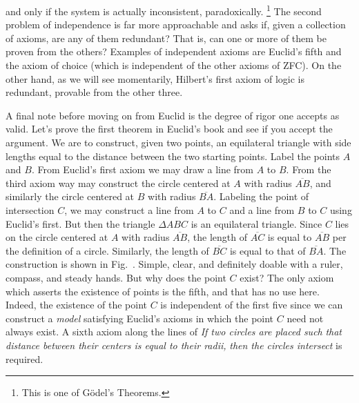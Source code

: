         and only if the system is actually inconsistent, paradoxically.%
        \footnote{%
            This is one of G\"{o}del's Theorems.
        }
        The second problem of independence is far more approachable and asks if,
        given a collection of axioms, are any of them redundant? That is, can
        one or more of them be proven from the others? Examples of independent
        axioms are Euclid's fifth and the axiom of choice (which is independent
        of the other axioms of ZFC). On the other hand, as we will see
        momentarily, Hilbert's first axiom of logic is redundant, provable from
        the other three.
        \par\hfill\par
        A final note before moving on from Euclid is the degree of rigor one
        accepts as valid. Let's prove the first theorem in Euclid's book and see
        if you accept the argument. We are to construct, given two points, an
        equilateral triangle with side lengths equal to the distance between the
        two starting points. Label the points $A$ and $B$. From Euclid's first
        axiom we may draw a line from $A$ to $B$. From the third axiom way may
        construct the circle centered at $A$ with radius $\overline{AB}$, and
        similarly the circle centered at $B$ with radius $\overline{BA}$.
        Labeling the point of intersection $C$, we may construct a line from $A$
        to $C$ and a line from $B$ to $C$ using Euclid's first. But then the
        triangle $\Delta{ABC}$ is an equilateral triangle. Since $C$ lies on the
        circle centered at $A$ with radius $\overline{AB}$, the length of
        $\overline{AC}$ is equal to $\overline{AB}$ per the definition of a
        circle. Similarly, the length of $\overline{BC}$ is equal to that of
        $\overline{BA}$. The construction is shown in
        Fig.~. Simple, clear, and definitely doable with
        a ruler, compass, and steady hands. But why does the point $C$ exist?
        The only axiom which asserts the existence of points is the fifth, and
        that has no use here. Indeed, the existence of the point $C$ is
        independent of the first five since we can construct a \textit{model}
        satisfying Euclid's axioms in which the point $C$ need not always exist.
        A sixth axiom along the lines of \textit{If two circles are placed such}
        \textit{that distance between their centers is equal to their radii,}
        \textit{then the circles intersect} is required.
